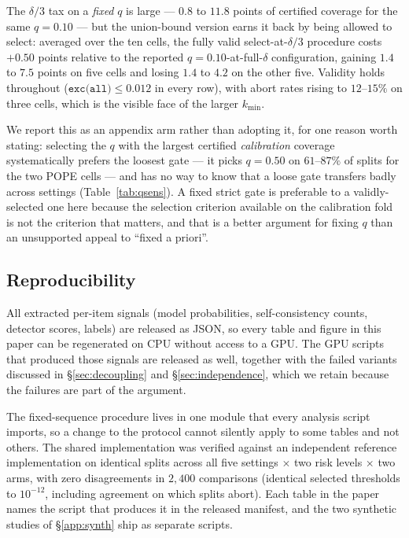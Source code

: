 \documentclass{article}
\theoremstyle{plain}
\theoremstyle{definition}
\theoremstyle{remark}
\begin{document}
The $\delta/3$ tax on a \emph{fixed} $q$ is large --- $0.8$ to $11.8$ points of certified coverage
for the same $q=0.10$ --- but the union-bound version earns it back by being allowed to select:
averaged over the ten cells, the fully valid select-at-$\delta/3$ procedure costs $+0.50$ points
relative to the reported $q=0.10$-at-full-$\delta$ configuration, gaining $1.4$ to $7.5$ points
on five cells and losing $1.4$ to $4.2$ on the other five. Validity holds throughout
($\texttt{exc(all)}\le0.012$ in every row), with abort rates rising to $12$--$15\%$ on three
cells, which is the visible face of the larger $k_{\min}$.

We report this as an appendix arm rather than adopting it, for one reason worth stating:
selecting the $q$ with the largest certified \emph{calibration} coverage systematically prefers
the loosest gate --- it picks $q=0.50$ on $61$--$87\%$ of splits for the two POPE cells --- and has
no way to know that a loose gate transfers badly across settings (Table~\ref{tab:qsens}). A fixed
strict gate is preferable to a validly-selected one here because the selection criterion
available on the calibration fold is not the criterion that matters, and that is a better
argument for fixing $q$ than an unsupported appeal to ``fixed a priori''.

\subsection{Reproducibility}
All extracted per-item signals (model probabilities, self-consistency counts, detector
scores, labels) are released as JSON, so every table and figure in this paper can be
regenerated on CPU without access to a GPU. The GPU scripts that produced those signals are
released as well, together with the failed variants discussed in \S\ref{sec:decoupling} and
\S\ref{sec:independence}, which we retain because the failures are part of the argument.

The fixed-sequence procedure lives in one module that every analysis script imports, so a change
to the protocol cannot silently apply to some tables and not others. The shared implementation was
verified against an independent reference implementation on identical splits across all five
settings $\times$ two risk levels $\times$ two arms, with zero disagreements in $2{,}400$
comparisons (identical selected thresholds to $10^{-12}$, including agreement on which splits
abort). Each table in the paper names the script that produces it in the released manifest, and
the two synthetic studies of \S\ref{app:synth} ship as separate scripts.
\end{document}
